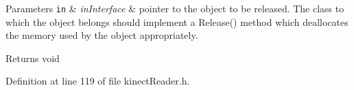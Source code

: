 \begin{DoxyParams}[1]{Parameters}
\mbox{\tt in}  & {\em in\+Interface} & pointer to the object to be released. The class to which the object belongs should implement a Release() method which deallocates the memory used by the object appropriately.\\
\hline
\end{DoxyParams}
\begin{DoxyReturn}{Returns}
void 
\end{DoxyReturn}


Definition at line 119 of file kinect\+Reader.\+h.

